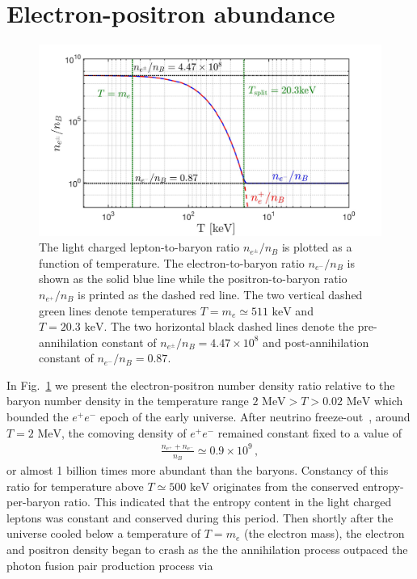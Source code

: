 \documentclass[a4paper]{article}
\newcommand*{\MeV}{\text{ MeV}}
\newcommand*{\keV}{\text{ keV}}
\newcommand{\rf}[1]{Fig.~{\ref{#1}}}
\begin{document}
\section{Electron-positron abundance}\label{sec:abundance}
\begin{figure}[ht]
    \centering
    \includegraphics[width=\textwidth]{EEPlasmaDensityRatio.jpg}
    \caption{The light charged lepton-to-baryon ratio $n_{e^{\pm}}/n_{B}$ is plotted as a function of temperature. The electron-to-baryon ratio $n_{e^{-}}/n_{B}$ is shown as the solid blue line while the positron-to-baryon ratio $n_{e^{+}}/n_{B}$ is printed as the dashed red line. The two vertical dashed green lines denote temperatures $T=m_{e}\simeq511\keV$ and $T=20.3\keV$. The two horizontal black dashed lines denote the pre-annihilation constant of $n_{e^{\pm}}/n_{B}=4.47\times10^{8}$ and post-annihilation constant of $n_{e^{-}}/n_{B}=0.87$.}
    \label{DensityRatio} 
\end{figure}
\noindent In \rf{DensityRatio} we present the electron-positron number density ratio relative to the baryon number density in the temperature range $2\MeV>T>0.02\MeV$ which bounded the $e^{+}e^{-}$ epoch of the early universe. After neutrino freeze-out~\cite{birrell2014relic}, around $T=2\MeV$, the comoving density of $e^{+}e^{-}$ remained constant fixed to a value of 
\begin{align}
    \frac{n_{e^{+}}+n_{e^{-}}}{n_{B}}\simeq0.9\times10^{9}\,,
\end{align}
or almost 1 billion times more abundant than the baryons. Constancy of this ratio for temperature above $T\simeq500\keV$ originates from the conserved entropy-per-baryon ratio. This indicated that the entropy content in the light charged leptons was constant and conserved during this period. Then shortly after the universe cooled below a temperature of $T=m_{e}$ (the electron mass), the electron and positron density began to crash as the the annihilation process outpaced the photon fusion pair production process via
\end{document}
